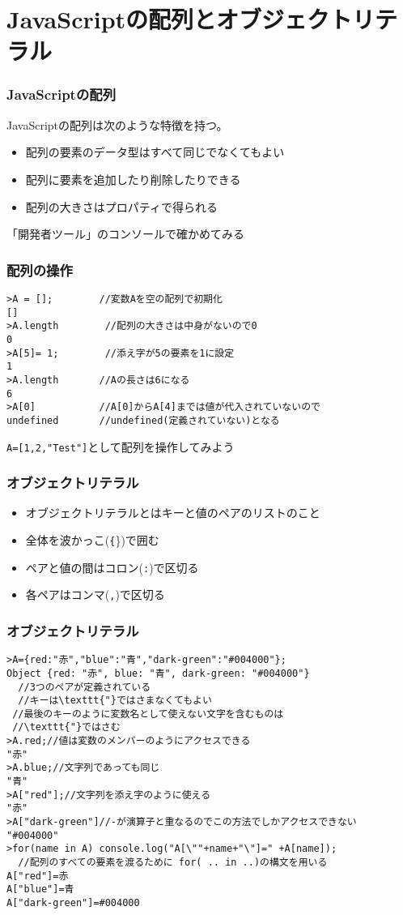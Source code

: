 

\frame{\maketitle}
 \section{JavaScriptの配列とオブジェクトリテラル}
\begin{frame}[containsverbatim]
  \frametitle{JavaScriptの配列}
  JavaScriptの配列は次のような特徴を持つ。
  \begin{itemize}
   \item 配列の要素のデータ型はすべて同じでなくてもよい
   \item 配列に要素を追加したり削除したりできる
   \item 配列の大きさはプロパティで得られる
  \end{itemize}
「開発者ツール」のコンソールで確かめてみる
 \end{frame}
 \begin{frame}[containsverbatim]
  \frametitle{配列の操作}
\begin{Verbatim}
>A = [];        //変数Aを空の配列で初期化
[]
>A.length        //配列の大きさは中身がないので0
0
>A[5]= 1;        //添え字が5の要素を1に設定
1
>A.length       //Aの長さは6になる
6
>A[0]           //A[0]からA[4]までは値が代入されていないので
undefined       //undefined(定義されていない)となる
\end{Verbatim}
  \Verb+A=[1,2,"Test"]+として配列を操作してみよう
 \end{frame}
 \begin{frame}[containsverbatim]
  \frametitle{オブジェクトリテラル}
  \begin{itemize}
   \item   オブジェクトリテラルとはキーと値のペアのリストのこと
   \item 全体を波かっこ(\texttt\{\})で囲む
   \item ペアと値の間はコロン(\texttt{:})で区切る
   \item 各ペアはコンマ(\texttt{,})で区切る
  \end{itemize}
 \end{frame}
 \begin{frame}[containsverbatim]
  \frametitle{オブジェクトリテラル}
  \small
\begin{Verbatim}
>A={red:"赤","blue":"青","dark-green":"#004000"};
Object {red: "赤", blue: "青", dark-green: "#004000"}
  //3つのペアが定義されている
  //キーは\texttt{"}ではさまなくてもよい
 //最後のキーのように変数名として使えない文字を含むものは
 //\texttt{"}ではさむ
>A.red;//値は変数のメンバーのようにアクセスできる
"赤"
>A.blue;//文字列であっても同じ
"青"
>A["red"];//文字列を添え字のように使える
"赤"
>A["dark-green"]//-が演算子と重なるのでこの方法でしかアクセスできない
"#004000"
>for(name in A) console.log("A[\""+name+"\"]=" +A[name]);
  //配列のすべての要素を渡るために for( .. in ..)の構文を用いる
A["red"]=赤
A["blue"]=青
A["dark-green"]=#004000
\end{Verbatim}
 \end{frame}
